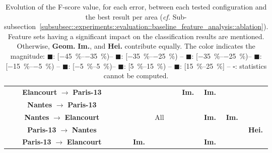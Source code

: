 \begin{table}[htbp]
\begin{tabular}{ c | c | c c c c |c c c c c}
                & \textbf{Elancourt} $\rightarrow$ \textbf{Paris-13}  & \cellcolor{LOSS0515}& \cellcolor{LOSS1525}& \cellcolor{STBL}& \cellcolor{LOSS1525}& \cellcolor{STBL}& \cellcolor{GAIN0515}\textbf{Im.}& \cellcolor{GAIN0515}\textbf{Im.}& \cellcolor{LOSS0515}&\cellcolor{STBL}\\
                & \textbf{Nantes} $\rightarrow$ \textbf{Paris-13}  & \cellcolor{LOSS0515}& \cellcolor{LOSS1525}& & \cellcolor{GAIN1525}& \cellcolor{STBL}& \cellcolor{GAIN0515}& \cellcolor{GAIN0515}& &\cellcolor{STBL}\\
                & \textbf{Nantes} $\rightarrow$ \textbf{Elancourt}  &\cellcolor{GAIN0515} & \cellcolor{LOSS0515}& \cellcolor{LOSS0515}&\cellcolor{GAIN0515}All & \cellcolor{STBL}& \cellcolor{LOSS1525}&\cellcolor{LOSS0515}\textbf{Im.} &\cellcolor{GAIN0515}\textbf{Im.} &\cellcolor{STBL}\\
                & \textbf{Paris-13} $\rightarrow$ \textbf{Nantes}  &\cellcolor{LOSS1525} & \cellcolor{LOSS0515}& & \cellcolor{GAIN0515}&\cellcolor{STBL} & \cellcolor{LOSS2535}& \cellcolor{STBL}& & \cellcolor{LOSS0515} \textbf{Hei.}\\
                & \textbf{Paris-13} $\rightarrow$ \textbf{Elancourt}  &\cellcolor{STBL} &\cellcolor{LOSS0515} & \cellcolor{GAIN0515}\textbf{Im.} & \cellcolor{STBL}& \cellcolor{STBL}& \cellcolor{LOSS3545}& \cellcolor{LOSS1525}\textbf{Im.} & & \cellcolor{STBL}\\
                \hline                                            
            \end{tabular}
            \renewcommand{\arraystretch}{1}
            \caption{
                \label{tab::transferability_comparison} Evolution of the F-score value, for each error, between each tested configuration and the best result per area (\textit{cf.} Sub-subsection~\ref{subsubsec::experiments::evaluation::baseline_feature_analysis::ablation}).
                Feature sets having a significant impact on the classification results are mentioned.
                Otherwise, \textbf{Geom.} \textbf{Im.}, and \textbf{Hei.} contribute equally.
                The color indicates the magnitude: \textcolor{LOSS3545}{$\blacksquare$}: [\SIrange[range-phrase={, }]{-45}{-35}{\percent})--
                \textcolor{LOSS2535}{$\blacksquare$}: [\SIrange[range-phrase={, }]{-35}{-25}{\percent}) --
                \textcolor{LOSS1525}{$\blacksquare$}: [\SIrange[range-phrase={, }]{-35}{-25}{\percent})--
                \textcolor{LOSS0515}{$\blacksquare$}: [\SIrange[range-phrase={, }]{-15}{-5}{\percent}) --
                \textcolor{STBL}{$\blacksquare$}: [\SIrange[range-phrase={, }]{-5}{5}{\percent})--
                \textcolor{GAIN0515}{$\blacksquare$}: [\SIrange[range-phrase={, }]{5}{15}{\percent}) --
                \textcolor{GAIN1525}{$\blacksquare$}: [\SIrange[range-phrase={, }]{15}{25}{\percent}] --
                $\square$: statistics cannot be computed.
            }
        \end{table}


